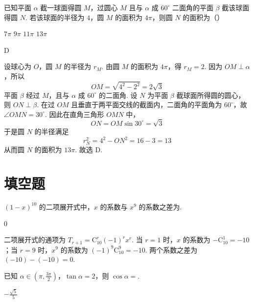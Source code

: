 \begin{problem}
已知平面 \(\alpha\) 截一球面得圆 \(M\)，过圆心 \(M\) 且与 \(\alpha\) 成 \(60^{\circ}\) 二面角的平面 \(\beta\) 截该球面得圆 \(N\). 若该球面的半径为 \(4\)，圆 \(M\) 的面积为 \(4\pi\)，则圆 \(N\) 的面积为（\quad）

\choices
    {\(7\pi\)}
    {\(9\pi\)}
    {\(11\pi\)}
    {\(13\pi\)}
\end{problem}

\begin{answer}
D
\end{answer}

\begin{solution}
设球心为 \(O\)，圆 \(M\) 的半径为 \(r_M\). 由圆 \(M\) 的面积为 \(4\pi\)，得 \(r_M=2\). 因为 \(OM\perp\alpha\)，所以
\[
OM=\sqrt{4^2-2^2}=2\sqrt{3}
\]
平面 \(\beta\) 经过 \(M\)，且与 \(\alpha\) 成 \(60^{\circ}\) 的二面角. 设 \(N\) 为平面 \(\beta\) 截球面所得圆的圆心，则 \(ON\perp\beta\). 在过 \(OM\) 且垂直于两平面交线的截面内，二面角的平面角为 \(60^{\circ}\)，故 \(\angle OMN=30^{\circ}\). 因此在直角三角形 \(OMN\) 中，
\[
ON=OM\sin30^{\circ}=\sqrt{3}
\]
于是圆 \(N\) 的半径满足
\[
r_N^2=4^2-ON^2=16-3=13
\]
从而圆 \(N\) 的面积为 \(13\pi\). 故选 D.
\end{solution}

\section{填空题}

\begin{problem}
\((1-x)^{10}\) 的二项展开式中，\(x\) 的系数与 \(x^9\) 的系数之差为\fillinblank{}.
\end{problem}

\begin{answer}
0
\end{answer}

\begin{solution}
二项展开式的通项为 \(T_{r+1}=\mathrm C_{10}^{r}(-1)^r x^r\). 当 \(r=1\) 时，\(x\) 的系数为 \(-\mathrm C_{10}^{1}=-10\)；当 \(r=9\) 时，\(x^9\) 的系数为 \((-1)^9\mathrm C_{10}^{9}=-10\). 两个系数之差为 \((-10)-(-10)=0\).
\end{solution}

\begin{problem}
已知 \(\alpha\in\left(\pi,\frac{3\pi}{2}\right)\)，\(\tan\alpha=2\)，则 \(\cos\alpha=\)\fillinblank{}.
\end{problem}

\begin{answer}
\(-\frac{\sqrt{5}}{5}\)
\end{answer}

